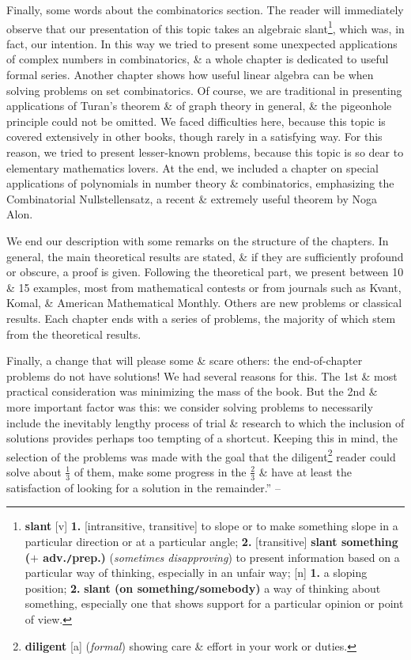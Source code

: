 \documentclass[oneside]{book}
\numberwithin{equation}{section}
\begin{document}
Finally, some words about the combinatorics section. The reader will immediately observe that our presentation of this topic takes an algebraic slant\footnote{\textbf{slant} [v] \textbf{1.} [intransitive, transitive] to slope or to make something slope in a particular direction or at a particular angle; \textbf{2.} [transitive] \textbf{slant something ($+$ adv.\texttt{/}prep.)} (\textit{sometimes disapproving}) to present information based on a particular way of thinking, especially in an unfair way; [n] \textbf{1.} a sloping position; \textbf{2.} \textbf{slant (on something\texttt{/}somebody)} a way of thinking about something, especially one that shows support for a particular opinion or point of view.}, which was, in fact, our intention. In this way we tried to present some unexpected applications of complex numbers in combinatorics, \& a whole chapter is dedicated to useful formal series. Another chapter shows how useful linear algebra can be when solving problems on set combinatorics. Of course, we are traditional in presenting applications of Turan's theorem \& of graph theory in general, \& the pigeonhole principle could not be omitted. We faced difficulties here, because this topic is covered extensively in other books, though rarely in a satisfying way. For this reason, we tried to present lesser-known problems, because this topic is so dear to elementary mathematics lovers. At the end, we included a chapter on special applications of polynomials in number theory \& combinatorics, emphasizing the Combinatorial Nullstellensatz, a recent \& extremely useful theorem by Noga Alon.

We end our description with some remarks on the structure of the chapters. In general, the main theoretical results are stated, \& if they are sufficiently profound or obscure, a proof is given. Following the theoretical part, we present between 10 \& 15  examples, most from mathematical contests or from journals such as Kvant, Komal, \& American Mathematical Monthly. Others are new problems or classical results. Each chapter ends with a series of problems, the majority of which stem from the theoretical results.

Finally, a change that will please some \& scare others: the end-of-chapter problems do not have solutions! We had several reasons for this. The 1st \& most practical consideration was minimizing the mass of the book. But the 2nd \& more important factor was this: we consider solving problems to necessarily include the inevitably lengthy process of trial \& research to which the inclusion of solutions provides perhaps too tempting of a shortcut. Keeping this in mind, the selection of the problems was made with the goal that the diligent\footnote{\textbf{diligent} [a] (\textit{formal}) showing care \& effort in your work or duties.} reader could solve about $\frac{1}{3}$ of them, make some progress in the $\frac{2}{3}$ \& have at least the satisfaction of looking for a solution in the remainder.'' -- \cite[Preface, pp. vii--xi]{Andreescu_Dospinescu2010}
\end{document}

